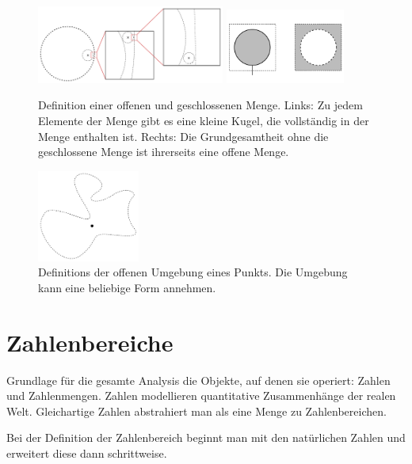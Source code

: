 \begin{figure}
    \centering
    \includegraphics[width=0.55\textwidth]{./svg/open-set}
    \includegraphics[width=0.35\textwidth]{./svg/closed-set}
    \caption{Definition einer offenen und geschlossenen Menge. Links: Zu jedem Elemente der Menge gibt es eine kleine Kugel, die vollständig in der Menge enthalten ist. Rechts: Die Grundgesamtheit ohne die geschlossene Menge ist ihrerseits eine offene Menge.}
    \label{fig:OpenClosedSet}
\end{figure}

\begin{figure}
    \centering
    \includegraphics[width=0.3\textwidth]{./svg/open-neighborhood}
    \caption{Definitions der offenen Umgebung eines Punkts. Die Umgebung kann eine beliebige Form annehmen.}
    \label{fig:OpenNeighborhood}
\end{figure}

\section{Zahlenbereiche}

Grundlage für die gesamte Analysis die Objekte, auf denen sie operiert: Zahlen und Zahlenmengen. Zahlen modellieren quantitative Zusammenhänge der realen Welt. Gleichartige Zahlen abstrahiert man als eine Menge zu Zahlenbereichen.

Bei der Definition der Zahlenbereich beginnt man mit den natürlichen Zahlen und erweitert diese dann schrittweise.

